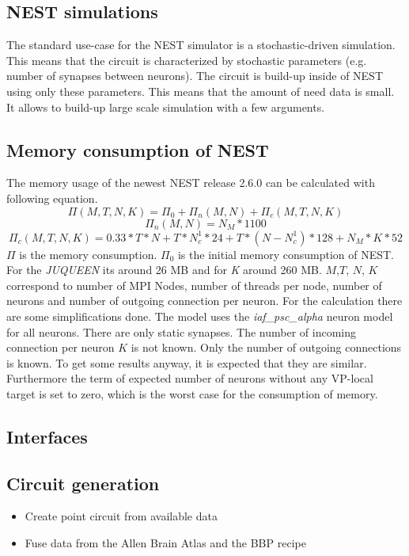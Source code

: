 \documentclass[a4paper]{article}
\begin{document}
\subsection{NEST simulations}
The standard use-case for the NEST simulator is a stochastic-driven simulation. This means
that the circuit is characterized by stochastic parameters (e.g. number of synapses between neurons).
The circuit is build-up inside of NEST using only these parameters.
This means that the amount of need data is small. It allows to build-up large scale simulation
with a few arguments.

\subsection{Memory consumption of NEST}
The memory usage of the newest NEST release 2.6.0 can be calculated with following equation. \cite{kunkel2014spiking}
\begin{equation}
  \Pi(M,T,N,K) =  \Pi_0 + \Pi_n(M,N)  + \Pi_c(M,T,N,K)
  \label{eq:NESTmemconsumption}
\end{equation} 
\begin{equation}
  \Pi_n(M,N) = N_M*1100
\end{equation}
\begin{equation}
  \Pi_c(M,T,N,K) = 0.33 * T * N + T * N^1_c * 24 + T*(N-N^1_c)*128 + N_M*K*52
\end{equation}
$\Pi$ is the memory consumption. $\Pi_0$ is the initial memory consumption of NEST.
For the \emph{JUQUEEN} its around 26 MB and for \emph{K} around 260 MB.
$M$,$T$, $N$, $K$ correspond to number of MPI Nodes, number of threads per node, number of neurons and number of outgoing connection per neuron.
For the calculation there are some simplifications done.
The model uses the \emph{iaf\_psc\_alpha} neuron model for all neurons. There are only static synapses.
The number of incoming connection per neuron $K$ is not known. Only the number of outgoing connections is known.
To get some results anyway, it is expected that they are similar.
Furthermore the term of expected number of neurons without any VP-local target is set to zero, which is the worst case for the consumption of memory.

\subsection{Interfaces}
\subsection{Circuit generation}
\begin{itemize}
      \item Create point circuit from available data
      \item Fuse data from the Allen Brain Atlas and the BBP recipe
   \end{itemize}
\end{document}
